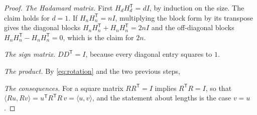 \begin{proof}
\emph{The Hadamard matrix.} First $H_d H_d^{\mathsf T} = d I$, by induction
on the size. The claim holds for $d = 1$. If $H_n H_n^{\mathsf T} = n I$,
multiplying the block form by its transpose gives the diagonal blocks
$H_n H_n^{\mathsf T} + H_n H_n^{\mathsf T} = 2 n I$ and the off-diagonal blocks
$H_n H_n^{\mathsf T} - H_n H_n^{\mathsf T} = 0$, which is the claim for $2n$.

\emph{The sign matrix.} $D D^{\mathsf T} = I$, because every diagonal entry
squares to $1$.

\emph{The product.} By \cref{eq:rotation} and the two previous steps,

\emph{The consequences.} For a square matrix $R R^{\mathsf T} = I$ implies
$R^{\mathsf T} R = I$, so that
$\langle R u, R v \rangle = u^{\mathsf T} R^{\mathsf T} R\, v = \langle u, v \rangle$,
and the statement about lengths is the case $v = u$.
\end{proof}


